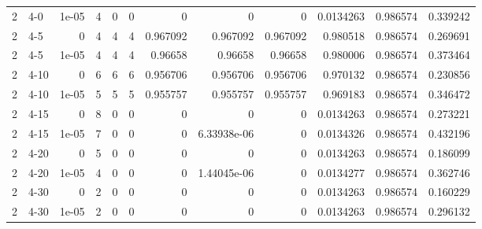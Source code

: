 \begin{tabular}{rlrrrrrrrrrr}
     2 & 4-0    &      1e-05 &           4 &                 0 &                 0 &     0           &     0           &      0           &        0.0134263 &               0.986574 &           0.339242 \\
     2 & 4-5    &      0     &           4 &                 4 &                 4 &     0.967092    &     0.967092    &      0.967092    &        0.980518  &               0.986574 &           0.269691 \\
     2 & 4-5    &      1e-05 &           4 &                 4 &                 4 &     0.96658     &     0.96658     &      0.96658     &        0.980006  &               0.986574 &           0.373464 \\
     2 & 4-10   &      0     &           6 &                 6 &                 6 &     0.956706    &     0.956706    &      0.956706    &        0.970132  &               0.986574 &           0.230856 \\
     2 & 4-10   &      1e-05 &           5 &                 5 &                 5 &     0.955757    &     0.955757    &      0.955757    &        0.969183  &               0.986574 &           0.346472 \\
     2 & 4-15   &      0     &           8 &                 0 &                 0 &     0           &     0           &      0           &        0.0134263 &               0.986574 &           0.273221 \\
     2 & 4-15   &      1e-05 &           7 &                 0 &                 0 &     0           &     6.33938e-06 &      0           &        0.0134326 &               0.986574 &           0.432196 \\
     2 & 4-20   &      0     &           5 &                 0 &                 0 &     0           &     0           &      0           &        0.0134263 &               0.986574 &           0.186099 \\
     2 & 4-20   &      1e-05 &           4 &                 0 &                 0 &     0           &     1.44045e-06 &      0           &        0.0134277 &               0.986574 &           0.362746 \\
     2 & 4-30   &      0     &           2 &                 0 &                 0 &     0           &     0           &      0           &        0.0134263 &               0.986574 &           0.160229 \\
     2 & 4-30   &      1e-05 &           2 &                 0 &                 0 &     0           &     0           &      0           &        0.0134263 &               0.986574 &           0.296132 \\

\end{tabular}

